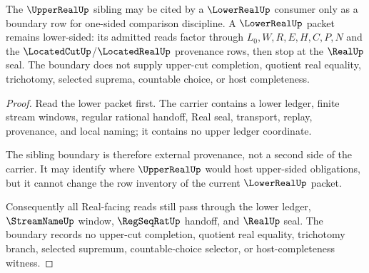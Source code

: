 \begin{theorem}
\label{thm:lowerreal-upperreal-duality-boundary}
The $\UpperRealUp$ sibling may be cited by a $\LowerRealUp$ consumer only as a boundary row for one-sided comparison discipline. A $\LowerRealUp$ packet remains lower-sided: its admitted reads factor through $L_0,W,R,E,H,C,P,N$ and the $\LocatedCutUp$/$\LocatedRealUp$ provenance rows, then stop at the $\RealUp$ seal. The boundary does not supply upper-cut completion, quotient real equality, trichotomy, selected suprema, countable choice, or host completeness.
\end{theorem}
\begin{proof}
Read the lower packet first. The carrier contains a lower ledger, finite stream windows, regular rational handoff, Real seal, transport, replay, provenance, and local naming; it contains no upper ledger coordinate.

The sibling boundary is therefore external provenance, not a second side of the carrier. It may identify where $\UpperRealUp$ would host upper-sided obligations, but it cannot change the row inventory of the current $\LowerRealUp$ packet.

Consequently all Real-facing reads still pass through the lower ledger, $\StreamNameUp$ window, $\RegSeqRatUp$ handoff, and $\RealUp$ seal. The boundary records no upper-cut completion, quotient real equality, trichotomy branch, selected supremum, countable-choice selector, or host-completeness witness.
\end{proof}

